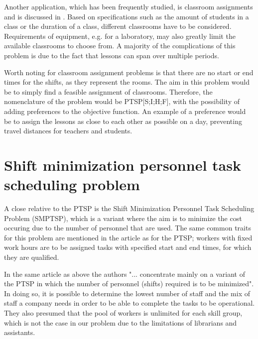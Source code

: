 Another application, which has been frequently studied, is classroom assignments and is discussed in \citet{krishnamoorthy_2001}. Based on specifications such as the amount of students in a class or the duration of a class, different classrooms have to be considered. Requirements of equipment, e.g. for a laboratory, may also greatly limit the available classrooms to choose from. A majority of the complications of this problem is due to the fact that lessons can span over multiple periods. 

Worth noting for classroom assignment problems is that there are no start or end times for the shifts, as they represent the rooms. The aim in this problem would be to simply find a feasible assignment of classrooms. Therefore, the nomenclature of the problem would be PTSP[S;I;H;F], with the possibility of adding preferences to the objective function. An example of a preference would be to assign the lessons as close to each other as possible on a day, preventing travel distances for teachers and students.



%
%



\section{Shift minimization personnel task scheduling problem}\label{SMTSP}
A close relative to the PTSP is the Shift Minimization Personnel Task Scheduling Problem (SMPTSP), which is a variant where the aim is to minimize the cost occuring due to the number of personnel that are used. The same common traits for this problem are mentioned in the article \citet{krishnamoorthy_2012} as for the PTSP; workers with fixed work hours are to be assigned tasks with specified start and end times, for which they are qualified.

In the same article as above the authors "... concentrate mainly on a variant of the PTSP in which the number of personnel (shifts) required is to be minimized". In doing so, it is possible to determine the lowest number of staff and the mix of staff a company needs in order to be able to complete the tasks to be operational. They also presumed that the pool of workers is unlimited for each skill group, which is not the case in our problem due to the limitations of librarians and assistants. 

